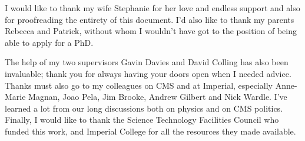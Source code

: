\begin{acknowledgements}
I would like to thank my wife Stephanie for her love and endless support and also for proofreading the entirety of this document. I'd also like to thank my parents Rebecca and Patrick, without whom I wouldn't have got to the position of being able to apply for a PhD.

The help of my two supervisors Gavin Davies and David Colling has also been invaluable; thank you for always having your doors open when I needed advice. Thanks must also go to my colleagues on CMS and at Imperial, especially Anne-Marie Magnan, Joao Pela, Jim Brooke, Andrew Gilbert and Nick Wardle. I've learned a lot from our long discussions both on physics and on CMS politics. Finally, I would like to thank the Science Technology Facilities Council who funded this work, and Imperial College for all the resources they made available.
\end{acknowledgements}



\tableofcontents

\renewcommand{\listfigurename}{List of figures}
\renewcommand{\listtablename}{List of tables}

\listoffigures
\listoftables

